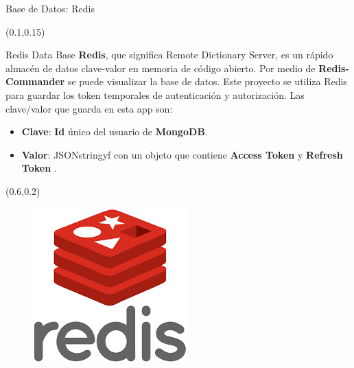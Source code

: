 \documentclass[xcolor=pdftex,dvipsnames,table]{beamer}
\begin{document}
\begin{frame}{Base de Datos: Redis}
    \begin{textblock*}{0.55\textwidth}(0.1\textwidth,0.15\textwidth)
            \begin{block}{Redis Data Base} 
            \justifying
                \textbf{Redis}, que significa Remote Dictionary Server, es un rápido almacén de datos clave-valor en memoria de código abierto. Por medio de \textbf{Redis-Commander} se puede visualizar la base de datos. Este proyecto se utiliza Redis para guardar los token temporales de autenticación y autorización. Las clave/valor que guarda en esta app son:
                    \vspace{-0.0cm}
                    \footnotesize {
                    \begin{itemize}
                      \setlength\itemsep{0.1em}
                        \item {\textbf{Clave}: \textbf{Id} único del usuario de \textbf{MongoDB}.}
                        \item {\textbf{Valor}: JSONstringyf con un objeto que contiene \textbf{Access Token} y \textbf{Refresh Token} .}
                    \end{itemize}}
            \end{block}
    \end{textblock*}
    
    
    \begin{textblock*}{0.5\textwidth}(0.6\textwidth,0.2\textwidth)
        \begin{figure}
            \centering
            \includegraphics[width=0.5\linewidth]{bd/red.png}
            \label{fig:my_label}
        \end{figure}
    \end{textblock*}
\end{frame}
\end{document}

